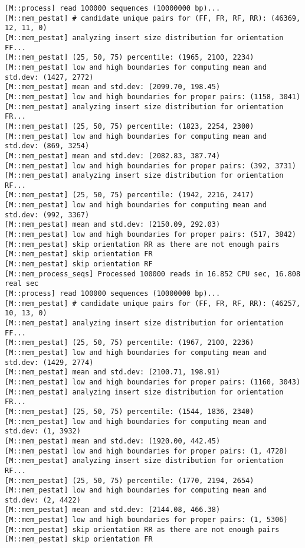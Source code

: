 \begin{lstlisting}
[M::process] read 100000 sequences (10000000 bp)...
[M::mem_pestat] # candidate unique pairs for (FF, FR, RF, RR): (46369, 12, 11, 0)
[M::mem_pestat] analyzing insert size distribution for orientation FF...
[M::mem_pestat] (25, 50, 75) percentile: (1965, 2100, 2234)
[M::mem_pestat] low and high boundaries for computing mean and std.dev: (1427, 2772)
[M::mem_pestat] mean and std.dev: (2099.70, 198.45)
[M::mem_pestat] low and high boundaries for proper pairs: (1158, 3041)
[M::mem_pestat] analyzing insert size distribution for orientation FR...
[M::mem_pestat] (25, 50, 75) percentile: (1823, 2254, 2300)
[M::mem_pestat] low and high boundaries for computing mean and std.dev: (869, 3254)
[M::mem_pestat] mean and std.dev: (2082.83, 387.74)
[M::mem_pestat] low and high boundaries for proper pairs: (392, 3731)
[M::mem_pestat] analyzing insert size distribution for orientation RF...
[M::mem_pestat] (25, 50, 75) percentile: (1942, 2216, 2417)
[M::mem_pestat] low and high boundaries for computing mean and std.dev: (992, 3367)
[M::mem_pestat] mean and std.dev: (2150.09, 292.03)
[M::mem_pestat] low and high boundaries for proper pairs: (517, 3842)
[M::mem_pestat] skip orientation RR as there are not enough pairs
[M::mem_pestat] skip orientation FR
[M::mem_pestat] skip orientation RF
[M::mem_process_seqs] Processed 100000 reads in 16.852 CPU sec, 16.808 real sec
[M::process] read 100000 sequences (10000000 bp)...
[M::mem_pestat] # candidate unique pairs for (FF, FR, RF, RR): (46257, 10, 13, 0)
[M::mem_pestat] analyzing insert size distribution for orientation FF...
[M::mem_pestat] (25, 50, 75) percentile: (1967, 2100, 2236)
[M::mem_pestat] low and high boundaries for computing mean and std.dev: (1429, 2774)
[M::mem_pestat] mean and std.dev: (2100.71, 198.91)
[M::mem_pestat] low and high boundaries for proper pairs: (1160, 3043)
[M::mem_pestat] analyzing insert size distribution for orientation FR...
[M::mem_pestat] (25, 50, 75) percentile: (1544, 1836, 2340)
[M::mem_pestat] low and high boundaries for computing mean and std.dev: (1, 3932)
[M::mem_pestat] mean and std.dev: (1920.00, 442.45)
[M::mem_pestat] low and high boundaries for proper pairs: (1, 4728)
[M::mem_pestat] analyzing insert size distribution for orientation RF...
[M::mem_pestat] (25, 50, 75) percentile: (1770, 2194, 2654)
[M::mem_pestat] low and high boundaries for computing mean and std.dev: (2, 4422)
[M::mem_pestat] mean and std.dev: (2144.08, 466.38)
[M::mem_pestat] low and high boundaries for proper pairs: (1, 5306)
[M::mem_pestat] skip orientation RR as there are not enough pairs
[M::mem_pestat] skip orientation FR

\end{lstlisting}
